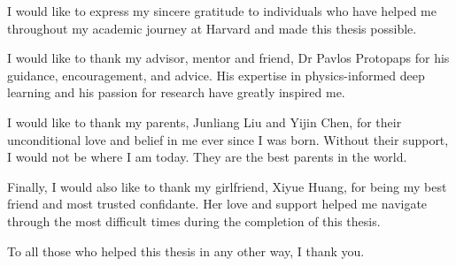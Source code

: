 
I would like to express my sincere gratitude to individuals who have helped me throughout my academic journey at Harvard and made this thesis possible.

I would like to thank my advisor, mentor and friend, Dr Pavlos Protopaps for his guidance, encouragement, and advice.
His expertise in physics-informed deep learning and his passion for research have greatly inspired me.

I would like to thank my parents, Junliang Liu and Yijin Chen, for their unconditional love and belief in me ever since I was born.
Without their support, I would not be where I am today.
They are the best parents in the world.

Finally, I would also like to thank my girlfriend, Xiyue Huang, for being my best friend and most trusted confidante. 
Her love and support helped me navigate through the most difficult times during the completion of this thesis.

To all those who helped this thesis in any other way, I thank you.